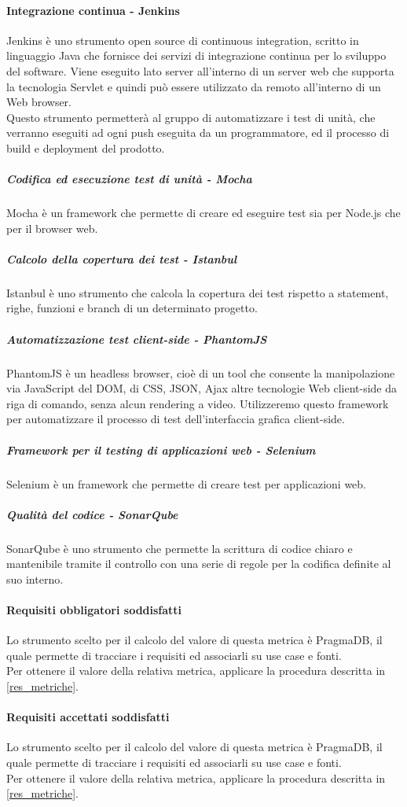 \paragraph{Integrazione continua - Jenkins}
Jenkins è uno strumento open source di continuous integration, scritto in linguaggio Java che fornisce dei servizi di integrazione continua per lo sviluppo del software. Viene eseguito lato server all'interno di un server web che supporta la tecnologia Servlet e quindi può essere utilizzato da remoto all'interno di un Web browser.\\
Questo strumento permetterà al gruppo di automatizzare i test di unità, che verranno eseguiti ad ogni push eseguita da un programmatore, ed il processo di build e deployment del prodotto.
\subparagraph{Codifica ed esecuzione test di unità - Mocha}
Mocha è un framework che permette di creare ed eseguire test sia per Node.js che per il browser web.
\subparagraph{Calcolo della copertura dei test - Istanbul}
Istanbul è uno strumento che calcola la copertura dei test rispetto a statement, righe, funzioni e branch di un determinato progetto.
\subparagraph{Automatizzazione test client-side - PhantomJS}
PhantomJS è un headless browser, cioè di un tool che consente la manipolazione via JavaScript del DOM, di CSS, JSON, Ajax altre tecnologie Web client-side da riga di comando, senza alcun rendering a video. Utilizzeremo questo framework per automatizzare il processo di test dell'interfaccia grafica client-side.
\subparagraph{Framework per il testing di applicazioni web - Selenium}
Selenium è un framework che permette di creare test per applicazioni web.
\subparagraph{Qualità del codice - SonarQube}
SonarQube è uno strumento che permette la scrittura di codice chiaro e mantenibile tramite il controllo con una serie di regole per la codifica definite al suo interno.

\paragraph{Requisiti obbligatori soddisfatti}
Lo strumento scelto per il calcolo del valore di questa metrica è PragmaDB, il quale permette di tracciare i requisiti ed associarli su use case e fonti.\\
Per ottenere il valore della relativa metrica, applicare la procedura descritta in \ref{res_metriche}.
\paragraph{Requisiti accettati soddisfatti}
Lo strumento scelto per il calcolo del valore di questa metrica è PragmaDB, il quale permette di tracciare i requisiti ed associarli su use case e fonti.\\
Per ottenere il valore della relativa metrica, applicare la procedura descritta in \ref{res_metriche}.
